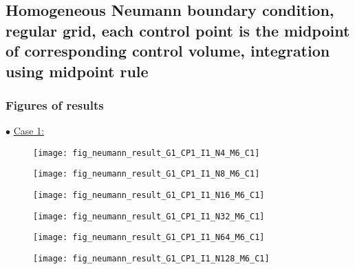 \documentclass{article}
\begin{document}
	\newpage
	\subsection{Homogeneous Neumann boundary condition, regular grid, each control point is the midpoint of corresponding control volume, integration using midpoint rule}
	\subsubsection{Figures of results}
	\noindent$\bullet$ \underline{Case 1:}
	\begin{figure}[H]
		\centering	\texttt{[image: fig\_neumann\_result\_G1\_CP1\_I1\_N4\_M6\_C1]}
	\end{figure}
	\begin{figure}[H]
		\centering	\texttt{[image: fig\_neumann\_result\_G1\_CP1\_I1\_N8\_M6\_C1]}
	\end{figure}
	\begin{figure}[H]
		\centering	\texttt{[image: fig\_neumann\_result\_G1\_CP1\_I1\_N16\_M6\_C1]}
	\end{figure}
	\begin{figure}[H]
		\centering	\texttt{[image: fig\_neumann\_result\_G1\_CP1\_I1\_N32\_M6\_C1]}
	\end{figure}
	\begin{figure}[H]
		\centering	\texttt{[image: fig\_neumann\_result\_G1\_CP1\_I1\_N64\_M6\_C1]}
	\end{figure}
	\begin{figure}[H]
		\centering	\texttt{[image: fig\_neumann\_result\_G1\_CP1\_I1\_N128\_M6\_C1]}
	\end{figure}
\end{document}
